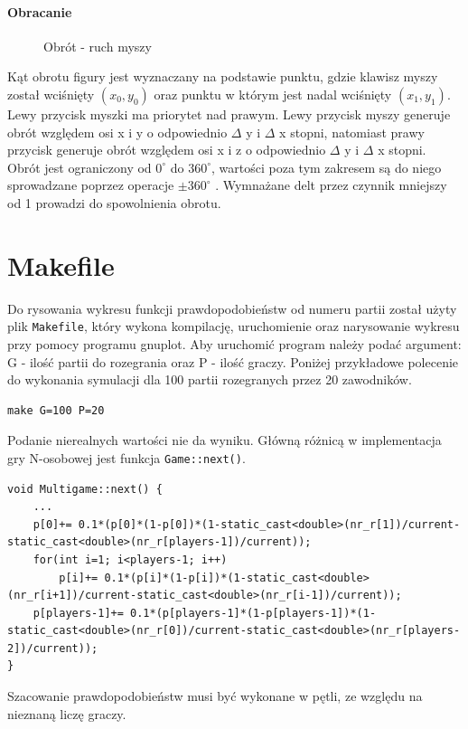 \paragraph{Obracanie}
\begin{figure}
    \centering
    \caption{Obrót - ruch myszy}
	\label{fig:obrot} 
\end{figure}
Kąt obrotu figury jest wyznaczany na podstawie punktu, gdzie klawisz myszy został wciśnięty $(x_0,y_0)$ oraz punktu w którym jest nadal wciśnięty $(x_1,y_1)$.
Lewy przycisk myszki ma priorytet nad prawym. Lewy przycisk myszy generuje obrót względem osi x i y o odpowiednio $\Delta$ y i $\Delta$ x stopni, natomiast prawy przycisk generuje obrót względem osi x i z o odpowiednio $\Delta$ y i $\Delta$ x stopni. Obrót jest ograniczony od $0^\circ$ do $360^\circ$, wartości poza tym zakresem są do niego sprowadzane poprzez operacje $\pm 360^\circ$ . Wymnażane delt przez czynnik mniejszy od 1 prowadzi do spowolnienia obrotu.



\section{Makefile}
\label{sec::makefile}
Do rysowania wykresu funkcji prawdopodobieństw od numeru partii został użyty plik \texttt{Makefile}, który wykona kompilację, uruchomienie oraz narysowanie wykresu przy pomocy programu gnuplot. Aby uruchomić program należy podać argument: G - ilość partii do rozegrania oraz P - ilość graczy. Poniżej przykładowe polecenie do wykonania symulacji dla 100 partii rozegranych przez 20 zawodników.
\begin{verbatim}
make G=100 P=20
\end{verbatim}
Podanie nierealnych wartości nie da wyniku. Główną różnicą w implementacja gry N-osobowej jest funkcja \texttt{Game::next()}.
\begin{lstlisting}
void Multigame::next() {
    ...
    p[0]+= 0.1*(p[0]*(1-p[0])*(1-static_cast<double>(nr_r[1])/current-static_cast<double>(nr_r[players-1])/current));
    for(int i=1; i<players-1; i++)
        p[i]+= 0.1*(p[i]*(1-p[i])*(1-static_cast<double>(nr_r[i+1])/current-static_cast<double>(nr_r[i-1])/current));
    p[players-1]+= 0.1*(p[players-1]*(1-p[players-1])*(1-static_cast<double>(nr_r[0])/current-static_cast<double>(nr_r[players-2])/current));
}
\end{lstlisting}
Szacowanie prawdopodobieństw musi być wykonane w pętli, ze względu na nieznaną liczę graczy.